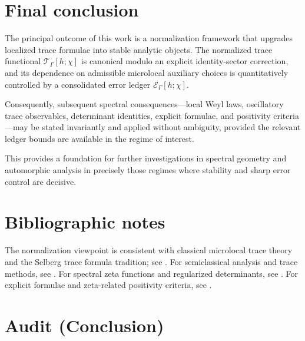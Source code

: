 \section{Final conclusion}
\label{sec:11.final}

The principal outcome of this work is a normalization framework that upgrades localized trace formulae into stable analytic objects.
The normalized trace functional $\mathcal T_\Gamma[h;\chi]$ is canonical modulo an explicit identity-sector correction, and its
dependence on admissible microlocal auxiliary choices is quantitatively controlled by a consolidated error ledger
$\mathcal E_\Gamma[h;\chi]$.

Consequently, subsequent spectral consequences---local Weyl laws, oscillatory trace observables, determinant identities, explicit
formulae, and positivity criteria---may be stated invariantly and applied without ambiguity, provided the relevant ledger bounds are
available in the regime of interest.

This provides a foundation for further investigations in spectral geometry and automorphic analysis in precisely those regimes where
stability and sharp error control are decisive.

\section*{Bibliographic notes}

The normalization viewpoint is consistent with classical microlocal trace theory and the Selberg trace formula tradition; see
\cite{Hejhal1983,Buser1992,Iwaniec2002}.  For semiclassical analysis and trace methods, see \cite{Zworski2012,DyatlovZworski2019}.
For spectral zeta functions and regularized determinants, see \cite{Seeley1967,RaySinger1971}.  For explicit formulae and zeta-related
positivity criteria, see \cite{Titchmarsh1986,Connes1999,Li1997}.


\section*{Audit (Conclusion)}\label{sec:11.audit}

